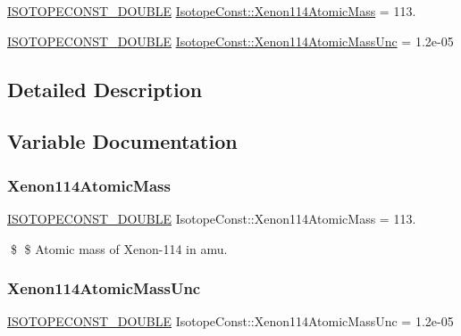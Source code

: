 \begin{DoxyCompactItemize}
\item 
\mbox{\hyperlink{group___isotope_const-_macros_ga8f45a7272ce02c0b4c65c44636ed719a}{I\+S\+O\+T\+O\+P\+E\+C\+O\+N\+S\+T\+\_\+\+D\+O\+U\+B\+LE}} \mbox{\hyperlink{group___isotope_const-_xenon-_xe114_gaa1a41fed9cbf1b35370fbac7ee5c050f}{Isotope\+Const\+::\+Xenon114\+Atomic\+Mass}} = 113.
\item 
\mbox{\hyperlink{group___isotope_const-_macros_ga8f45a7272ce02c0b4c65c44636ed719a}{I\+S\+O\+T\+O\+P\+E\+C\+O\+N\+S\+T\+\_\+\+D\+O\+U\+B\+LE}} \mbox{\hyperlink{group___isotope_const-_xenon-_xe114_gad23bec2859ffa5630f0f1c33c20bd086}{Isotope\+Const\+::\+Xenon114\+Atomic\+Mass\+Unc}} = 1.\+2e-\/05
\end{DoxyCompactItemize}


\subsection{Detailed Description}


\subsection{Variable Documentation}
\mbox{\label{group___isotope_const-_xenon-_xe114_gaa1a41fed9cbf1b35370fbac7ee5c050f}} 
\subsubsection{\texorpdfstring{Xenon114\+Atomic\+Mass}{Xenon114AtomicMass}}
{\footnotesize\ttfamily \mbox{\hyperlink{group___isotope_const-_macros_ga8f45a7272ce02c0b4c65c44636ed719a}{I\+S\+O\+T\+O\+P\+E\+C\+O\+N\+S\+T\+\_\+\+D\+O\+U\+B\+LE}} Isotope\+Const\+::\+Xenon114\+Atomic\+Mass = 113.}

\$ \$ Atomic mass of Xenon-\/114 in amu. \mbox{\label{group___isotope_const-_xenon-_xe114_gad23bec2859ffa5630f0f1c33c20bd086}} 
\subsubsection{\texorpdfstring{Xenon114\+Atomic\+Mass\+Unc}{Xenon114AtomicMassUnc}}
{\footnotesize\ttfamily \mbox{\hyperlink{group___isotope_const-_macros_ga8f45a7272ce02c0b4c65c44636ed719a}{I\+S\+O\+T\+O\+P\+E\+C\+O\+N\+S\+T\+\_\+\+D\+O\+U\+B\+LE}} Isotope\+Const\+::\+Xenon114\+Atomic\+Mass\+Unc = 1.\+2e-\/05}

